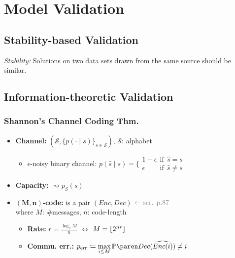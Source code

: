 \section{Model Validation}

\subsection{Stability-based Validation}

\emph{Stability:}\enspace
Solutions on two data sets drawn from the same source should be similar.


\subsection{Information-theoretic Validation}

\subsubsection{Shannon's Channel Coding Thm.}

\begin{itemize}
    \item \textbf{Channel:}\enspace
        $(\mathcal S, \{p(\cdot\mid s)\}_{s\in\mathcal S} )$,\enspace
        $\mathcal S$: alphabet
        \begin{itemize}
            \item $\epsilon$-noisy binary channel:
                $p(\hat s\mid s) = \big\{ \substack{
                    1-\epsilon \:\:\text{if}\:\: \hat s=s \\
                    \epsilon \phantom{1-} \:\:\text{if}\:\: \hat s\neq s}$
        \end{itemize}
        \vspace{-3pt}
    \item \textbf{Capacity:}\enspace
        $\rightsquigarrow p_S(s)$
    \item \textbf{$\bm{(M,n)}$-code:}\enspace
        is a pair $(Enc,Dec)$\hfill
        $\color{gray} \leftarrow\text{scr. p.87}$\\\quad
        where $M$: \#messages, $n$: code-length
        \begin{itemize}
            \item \textbf{Rate:}\enspace
                $r = \frac{\log_2 M}{n}$
                $\Leftrightarrow$ $M=\lfloor2^{nr}\rfloor$
            \item \textbf{Commu. err.:}\enspace
                $p\ped{err} \coloneqq \max\limits_{i\leq M}
                \P{ Dec(\widehat{ Enc(i) }) \neq i }$
        \end{itemize}
\end{itemize}

